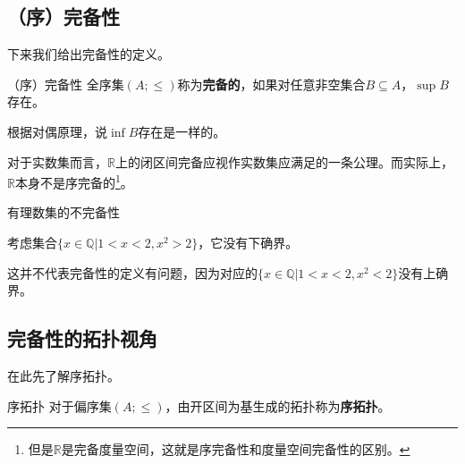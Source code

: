 \subsection{（序）完备性}

下来我们给出完备性的定义。

\begin{definition}{（序）完备性}
全序集$(A;\leq)$称为\textbf{完备的}，如果对任意非空集合$B\subseteq A$，$\sup B$存在。
\end{definition}

根据对偶原理，说$\inf B$存在是一样的。

对于实数集而言，$\mathbb{R}$上的闭区间完备应视作实数集应满足的一条公理。而实际上，$\mathbb{R}$本身不是序完备的\footnote{但是$\mathbb{R}$是完备度量空间，这就是序完备性和度量空间完备性的区别。}。

\begin{example}{有理数集的不完备性}

考虑集合$\{x\in\mathbb{Q}|1<x<2,x^2>2\}$，它没有下确界。

这并不代表完备性的定义有问题，因为对应的$\{x\in\mathbb{Q}|1<x<2,x^2<2\}$没有上确界。
\end{example}

\subsection{完备性的拓扑视角}

在此先了解序拓扑。

\begin{definition}{序拓扑}
对于偏序集$(A;\leq)$，由开区间为基生成的拓扑称为\textbf{序拓扑}。
\end{definition}

